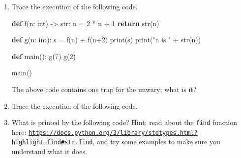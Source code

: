 \documentclass[]{article}
\newenvironment{Shaded}{}{}
\newcommand{\KeywordTok}[1]{\textcolor[rgb]{0.00,0.44,0.13}{\textbf{{#1}}}}
\newcommand{\DecValTok}[1]{\textcolor[rgb]{0.25,0.63,0.44}{{#1}}}
\newcommand{\StringTok}[1]{\textcolor[rgb]{0.25,0.44,0.63}{{#1}}}
\newcommand{\ControlFlowTok}[1]{\textcolor[rgb]{0.00,0.44,0.13}{\textbf{{#1}}}}
\newcommand{\OperatorTok}[1]{\textcolor[rgb]{0.40,0.40,0.40}{{#1}}}
\newcommand{\BuiltInTok}[1]{{#1}}
\newcommand{\NormalTok}[1]{{#1}}
\begin{document}
\begin{enumerate}
\def\labelenumi{\arabic{enumi}.}
\item
  Trace the execution of the following code.

\begin{Shaded}
\begin{Highlighting}[]
\KeywordTok{def} \NormalTok{f(n: }\BuiltInTok{int}\NormalTok{) }\OperatorTok{->} \BuiltInTok{str}\NormalTok{:}
    \NormalTok{n }\OperatorTok{=} \DecValTok{2} \OperatorTok{*} \NormalTok{n }\OperatorTok{+} \DecValTok{1}
    \ControlFlowTok{return} \BuiltInTok{str}\NormalTok{(n)}

\KeywordTok{def} \NormalTok{g(n: }\BuiltInTok{int}\NormalTok{):}
    \NormalTok{s }\OperatorTok{=} \NormalTok{f(n) }\OperatorTok{+} \NormalTok{f(n}\DecValTok{+2}\NormalTok{)}
    \BuiltInTok{print}\NormalTok{(s)}
    \BuiltInTok{print}\NormalTok{(}\StringTok{"n is "} \OperatorTok{+} \BuiltInTok{str}\NormalTok{(n))}

\KeywordTok{def} \NormalTok{main():}
    \NormalTok{g(}\DecValTok{7}\NormalTok{)}
    \NormalTok{g(}\DecValTok{2}\NormalTok{)}

\NormalTok{main()}
\end{Highlighting}
\end{Shaded}

  The above code contains one trap for the unwary; what is it?
\item
  Trace the execution of the following code.

\begin{Shaded}
\end{Shaded}
\item
  What is printed by the following code? Hint: read about the
  \texttt{find} function here:
  \href{https://docs.python.org/3/library/stdtypes.html?highlight=find\#str.find}{\texttt{https://docs.python.org/3/library/stdtypes.html?highlight=find\#str.find}},
  and try some examples to make sure you understand what it does.


\end{enumerate}
\end{document}

